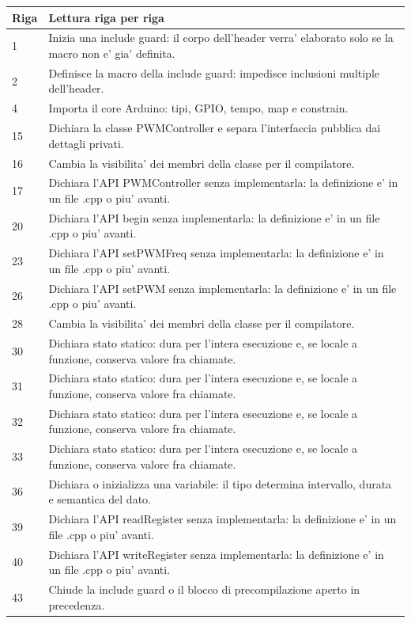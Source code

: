\documentclass[11pt,a4paper]{article}
\begin{document}
\begin{longtable}{p{}p{}}
\toprule
\textbf{Riga} & \textbf{Lettura riga per riga} \\
\midrule
\endhead
1 & Inizia una include guard: il corpo dell'header verra' elaborato solo se la macro non e' gia' definita. \\
2 & Definisce la macro della include guard: impedisce inclusioni multiple dell'header. \\
4 & Importa il core Arduino: tipi, GPIO, tempo, map e constrain. \\
15 & Dichiara la classe PWMController e separa l'interfaccia pubblica dai dettagli privati. \\
16 & Cambia la visibilita' dei membri della classe per il compilatore. \\
17 & Dichiara l'API PWMController senza implementarla: la definizione e' in un file .cpp o piu' avanti. \\
20 & Dichiara l'API begin senza implementarla: la definizione e' in un file .cpp o piu' avanti. \\
23 & Dichiara l'API setPWMFreq senza implementarla: la definizione e' in un file .cpp o piu' avanti. \\
26 & Dichiara l'API setPWM senza implementarla: la definizione e' in un file .cpp o piu' avanti. \\
28 & Cambia la visibilita' dei membri della classe per il compilatore. \\
30 & Dichiara stato statico: dura per l'intera esecuzione e, se locale a funzione, conserva valore fra chiamate. \\
31 & Dichiara stato statico: dura per l'intera esecuzione e, se locale a funzione, conserva valore fra chiamate. \\
32 & Dichiara stato statico: dura per l'intera esecuzione e, se locale a funzione, conserva valore fra chiamate. \\
33 & Dichiara stato statico: dura per l'intera esecuzione e, se locale a funzione, conserva valore fra chiamate. \\
36 & Dichiara o inizializza una variabile: il tipo determina intervallo, durata e semantica del dato. \\
39 & Dichiara l'API readRegister senza implementarla: la definizione e' in un file .cpp o piu' avanti. \\
40 & Dichiara l'API writeRegister senza implementarla: la definizione e' in un file .cpp o piu' avanti. \\
43 & Chiude la include guard o il blocco di precompilazione aperto in precedenza. \\
\bottomrule
\end{longtable}
\end{document}
